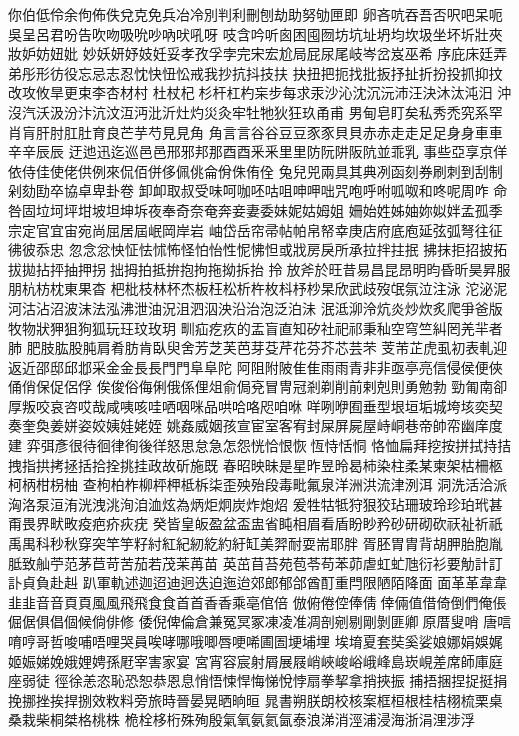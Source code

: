 你伯低伶余佝佈佚兌克免兵冶冷別判利刪刨劫助努劬匣即
卵吝吭吞吾否呎吧呆呃吳呈呂君吩告吹吻吸吮吵吶吠吼呀
吱含吟听囪困囤囫坊坑址坍均坎圾坐坏圻壯夾妝妒妨妞妣
妙妖妍妤妓妊妥孝孜孚孛完宋宏尬局屁尿尾岐岑岔岌巫希
序庇床廷弄弟彤形彷役忘忌志忍忱快忸忪戒我抄抗抖技扶
抉扭把扼找批扳抒扯折扮投抓抑抆改攻攸旱更束李杏材村
杜杖杞杉杆杠杓杗步每求汞沙沁沈沉沅沛汪決沐汰沌汨
沖沒汽沃汲汾汴沆汶沍沔沘沂灶灼災灸牢牡牠狄狂玖甬甫
男甸皂盯矣私秀禿究系罕肖肓肝肘肛肚育良芒芋芍見⾒角
⾓言⾔谷⾕豆⾖豕⾗貝⾙赤⾚走⾛足⾜身⾝車⾞辛⾟辰⾠
迂迆迅迄巡⾢邑邢邪邦那酉⾣釆⾤里⾥防阮阱阪阬並乖乳
事些亞享京佯依侍佳使佬供例來侃佰併侈佩佻侖佾侏侑佺
兔兒兕兩具其典冽函刻券刷刺到刮制剁劾劻卒協卓卑卦卷
卸卹取叔受味呵咖呸咕咀呻呷咄咒咆呼咐呱呶和咚呢周咋
命咎固垃坷坪坩坡坦坤坼夜奉奇奈奄奔妾妻委妹妮姑姆姐
姍始姓姊妯妳姒姅孟孤季宗定官宜宙宛尚屈居屆岷岡岸岩
岫岱岳帘帚帖帕帛帑幸庚店府底庖延弦弧弩往征彿彼忝忠
忽念忿怏怔怯怵怖怪怕怡性怩怫怛或戕房戾所承拉拌拄抿
拂抹拒招披拓拔拋拈抨抽押拐拙拇拍抵拚抱拘拖拗拆抬
拎放斧於旺昔易昌昆昂明昀昏昕昊昇服朋杭枋枕東果杳
杷枇枝林杯杰板枉松析杵枚枓杼杪杲欣武歧歿氓氛泣注泳
沱泌泥河沽沾沼波沫法泓沸泄油況沮泗泅泱沿治泡泛泊沬
泯泜泖泠炕炎炒炊炙爬爭爸版牧物狀狎狙狗狐玩玨玟玫玥
甽疝疙疚的盂盲直知矽社祀祁秉秈空穹竺糾罔羌羋者肺
肥肢肱股肫肩肴肪肯臥臾舍芳芝芙芭芽芟芹花芬芥芯芸芣
芰芾芷虎虱初表軋迎返近邵邸邱邶采金⾦長⾧門⾨阜⾩陀
阿阻附陂隹⾫雨⾬青⾮非亟亭亮信侵侯便俠俑俏保促侶俘
俟俊俗侮俐俄係俚俎俞侷兗冒冑冠剎剃削前剌剋則勇勉勃
勁匍南卻厚叛咬哀咨哎哉咸咦咳哇哂咽咪品哄哈咯咫咱咻
咩咧咿囿垂型垠垣垢城垮垓奕契奏奎奐姜姘姿姣姨娃姥姪
姚姦威姻孩宣宦室客宥封屎屏屍屋峙峒巷帝帥帟幽庠度建
弈弭彥很待徊律徇後徉怒思怠急怎怨恍恰恨恢恆恃恬恫
恪恤扁拜挖按拼拭持拮拽指拱拷拯括拾拴挑挂政故斫施既
春昭映昧是星昨昱昤曷柿染柱柔某柬架枯柵柩柯柄柑枴柚
查枸柏柞柳枰柙柢柝柒歪殃殆段毒毗氟泉洋洲洪流津洌洱
洞洗活洽派洶洛泵洹洧洸洩洮洵洎洫炫為炳炬炯炭炸炮炤
爰牲牯牴狩狠狡玷珊玻玲珍珀玳甚甭畏界畎畋疫疤疥疢疣
癸皆皇皈盈盆盃盅省盹相眉看盾盼眇矜砂研砌砍祆祉祈祇
禹禺科秒秋穿突竿竽籽紂紅紀紉紇約紆缸美羿耐耍耑耶胖
胥胚胃胄背胡胛胎胞胤胝致舢苧范茅苣苛苦茄若茂茉苒苗
英茁苜苔苑苞苓苟苯茆虐虹虻虺衍衫要觔計訂訃貞負赴赳
趴軍軌述迦迢迪迥迭迫迤迨郊郎郁郃酋酊重閂限陋陌降面
⾯革⾰韋⾱韭⾲音⾳頁⾴風⾵飛⾶食⾷首⾸香⾹乘亳倌倍
倣俯倦倥俸倩倖倆值借倚倒們俺倀倔倨俱倡個候倘俳修
倭倪俾倫倉兼冤冥冢凍凌准凋剖剜剔剛剝匪卿原厝叟哨
唐唁唷哼哥哲唆哺唔哩哭員唉哮哪哦唧唇哽唏圃圄埂埔埋
埃堉夏套奘奚娑娘娜娟娛娓姬娠娣娩娥娌娉孫屘宰害家宴
宮宵容宸射屑展屐峭峽峻峪峨峰島崁峴差席師庫庭座弱徒
徑徐恙恣恥恐恕恭恩息悄悟悚悍悔悌悅悖扇拳挈拿捎挾振
捕捂捆捏捉挺捐挽挪挫挨捍捌效敉料旁旅時晉晏晃晒晌晅
晁書朔朕朗校核案框桓根桂桔栩梳栗桌桑栽柴桐桀格桃株
桅栓栘桁殊殉殷氣氧氨氦氤泰浪涕消涇浦浸海浙涓浬涉浮
